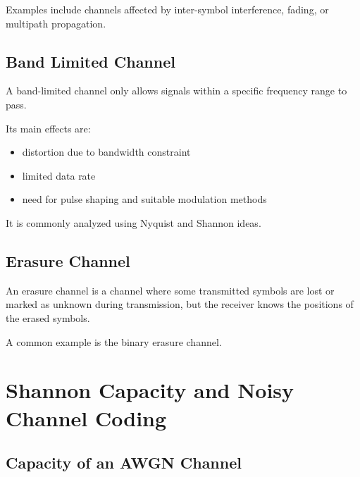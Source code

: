 \documentclass[11pt,a4paper]{book}
\newenvironment{definitionbox}[1][Definition]{%
    \begin{tcolorbox}[
        enhanced,
        breakable,
        colback=primaryblue!10,
        colframe=primaryblue!150,
        title=#1,
        fonttitle=\bfseries,
        sharp corners,
        boxrule=0.8pt,
        left=8pt,
        right=8pt,
        top=6pt,
        bottom=6pt
    ]
}{\end{tcolorbox}}
\begin{document}
Examples include channels affected by inter-symbol interference, fading, or multipath propagation.

\subsection{Band Limited Channel}

\begin{definitionbox}[Band Limited Channel]
A band-limited channel only allows signals within a specific frequency range to pass.
\end{definitionbox}

Its main effects are:
\begin{itemize}
    \item distortion due to bandwidth constraint
    \item limited data rate
    \item need for pulse shaping and suitable modulation methods
\end{itemize}

It is commonly analyzed using Nyquist and Shannon ideas.

\subsection{Erasure Channel}

\begin{definitionbox}[Erasure Channel]
An erasure channel is a channel where some transmitted symbols are lost or marked as unknown during transmission, but the receiver knows the positions of the erased symbols.
\end{definitionbox}

A common example is the binary erasure channel.

\section{Shannon Capacity and Noisy Channel Coding}

\subsection{Capacity of an AWGN Channel}
\end{document}
